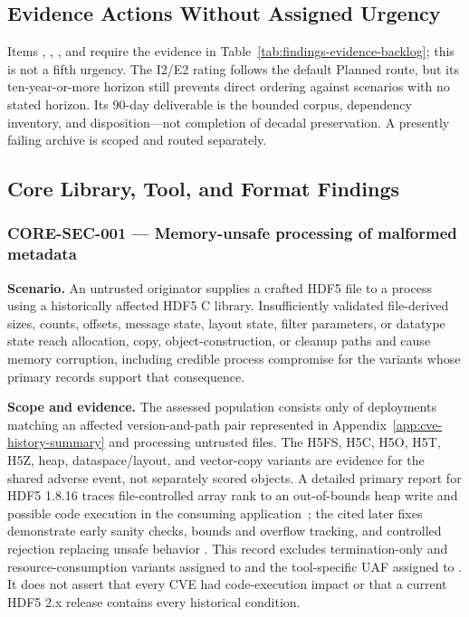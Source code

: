\documentclass[../main.tex]{subfiles}
\begin{document}
\subsection{Evidence Actions Without Assigned Urgency}
\label{sec:findings-evidence-actions}

Items , , , and
 require the evidence in
Table~\ref{tab:findings-evidence-backlog}; this is not a fifth urgency. The
I2/E2  rating follows the default Planned route, but its
ten-year-or-more horizon still prevents direct ordering against scenarios with
no stated horizon. Its 90-day deliverable is the bounded corpus, dependency
inventory, and disposition---not completion of decadal preservation. A
presently failing archive is scoped and routed separately.

\subsection{Core Library, Tool, and Format Findings}

\subsubsection*{CORE-SEC-001 --- Memory-unsafe processing of malformed metadata}

\noindent\textbf{Scenario.}
An untrusted originator supplies a crafted HDF5 file to a process using a
historically affected HDF5 C library. Insufficiently validated file-derived
sizes, counts, offsets, message state, layout state, filter parameters, or
datatype state reach allocation, copy, object-construction, or cleanup paths
and cause memory corruption, including credible process compromise for the
variants whose primary records support that consequence.

\noindent\textbf{Scope and evidence.}
The assessed population consists only of deployments matching an affected
version-and-path pair represented in Appendix~\ref{app:cve-history-summary} and
processing untrusted files. The H5FS, H5C, H5O, H5T, H5Z, heap,
dataspace/layout, and vector-copy variants are evidence for the shared adverse
event, not separately scored objects. A detailed primary report for HDF5 1.8.16
traces file-controlled array rank to an out-of-bounds heap write and possible
code execution in the consuming application~\cite{talos-hdf5-2016-0176}; the
cited later fixes demonstrate early sanity checks, bounds and overflow
tracking, and controlled rejection replacing unsafe behavior
\cite{cve_hdf5,commit_804f3ba,commit_3914bb7,commit_ce53bc0}. This record
excludes termination-only and resource-consumption variants assigned to
 and the tool-specific UAF assigned to
. It does not assert that every CVE had code-execution
impact or that a current HDF5 2.x release contains every historical condition.
\end{document}
